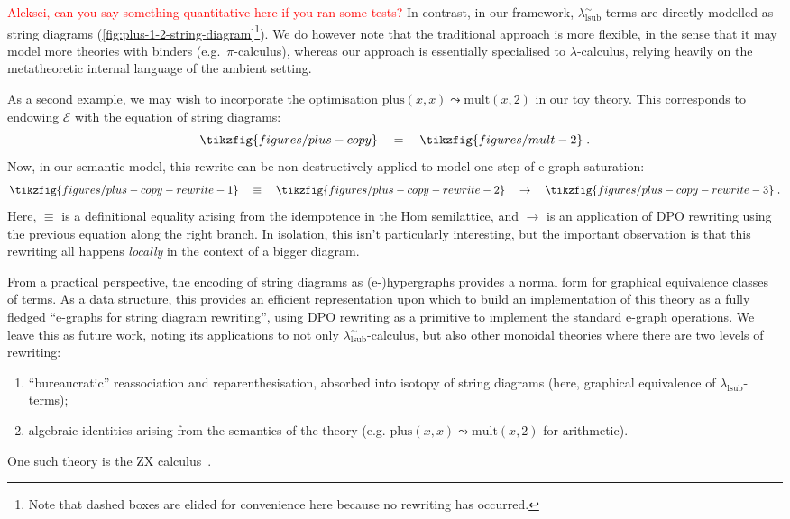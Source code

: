 \textcolor{red}{Aleksei, can you say something quantitative here if you ran some tests?}
In contrast, in our framework, $\lambda^\sim_{\text{lsub}}$-terms are directly modelled as string diagrams (\autoref{fig:plus-1-2-string-diagram}\footnote{Note that dashed boxes are elided for convenience here because no rewriting has occurred.}).
We do however note that the traditional approach is more flexible, in the sense that it may model more theories with binders (e.g.\ $\pi$-calculus), whereas our approach is essentially specialised to $\lambda$-calculus, relying heavily on the metatheoretic internal language of the ambient setting.

As a second example, we may wish to incorporate the optimisation ${\text{plus} (x, x) \leadsto \text{mult} (x, 2)}$ in our toy theory.
This corresponds to endowing $\mathcal{E}$ with the equation of string diagrams:
\[
	\tikzfig{figures/plus-copy}
	\quad
	=
	\quad
	\tikzfig{figures/mult-2}
	\;
	.
\]
Now, in our semantic model, this rewrite can be non-destructively applied to model one step of e-graph saturation:
\[
	\tikzfig{figures/plus-copy-rewrite-1}
	\quad
	\equiv
	\quad
	\tikzfig{figures/plus-copy-rewrite-2}
	\quad
	\to
	\quad
	\tikzfig{figures/plus-copy-rewrite-3}
	\;
	.
\]
Here, $\equiv$ is a definitional equality arising from the idempotence in the Hom semilattice, and $\to$ is an application of DPO rewriting using the previous equation along the right branch.
In isolation, this isn't particularly interesting, but the important observation is that this rewriting all happens \emph{locally} in the context of a bigger diagram.

From a practical perspective, the encoding of string diagrams as (e-)hypergraphs provides a normal form for graphical equivalence classes of terms.
As a data structure, this provides an efficient representation upon which to build an implementation of this theory as a fully fledged \enquote{e-graphs for string diagram rewriting}, using DPO rewriting as a primitive to implement the standard e-graph operations.
We leave this as future work, noting its applications to not only $\lambda^\sim_{\text{lsub}}$-calculus, but also other monoidal theories where there are two levels of rewriting:
\begin{enumerate}
	\item \enquote{bureaucratic} reassociation and reparenthesisation, absorbed into isotopy of string diagrams (here, graphical equivalence of $\lambda_{\text{lsub}}$-terms);
	\item algebraic identities arising from the semantics of the theory (e.g. ${\text{plus} (x, x) \leadsto \text{mult} (x, 2)}$ for arithmetic).
\end{enumerate}
One such theory is the ZX calculus~\cite{coeckeInteractingQuantumObservables2011}.
